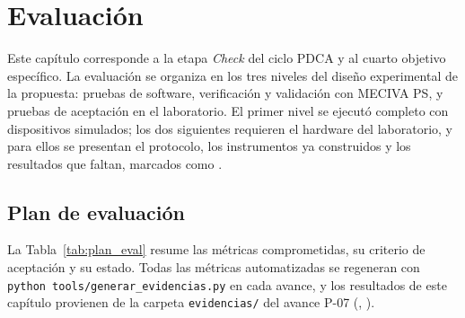 \chapter{Evaluación}
\label{cap:evaluacion}

Este capítulo corresponde a la etapa \textit{Check} del ciclo PDCA y al cuarto objetivo específico. La evaluación se organiza en los tres niveles del diseño experimental de la propuesta: pruebas de software, verificación y validación con MECIVA PS, y pruebas de aceptación en el laboratorio. El primer nivel se ejecutó completo con dispositivos simulados; los dos siguientes requieren el hardware del laboratorio, y para ellos se presentan el protocolo, los instrumentos ya construidos y los resultados que faltan, marcados como .

\section{Plan de evaluación}

La Tabla~\ref{tab:plan_eval} resume las métricas comprometidas, su criterio de aceptación y su estado. Todas las métricas automatizadas se regeneran con \texttt{python tools/generar\_evidencias.py} en cada avance, y los resultados de este capítulo provienen de la carpeta \texttt{evidencias/} del avance P-07 (\PSieteEntorno, \PSieteFecha).


